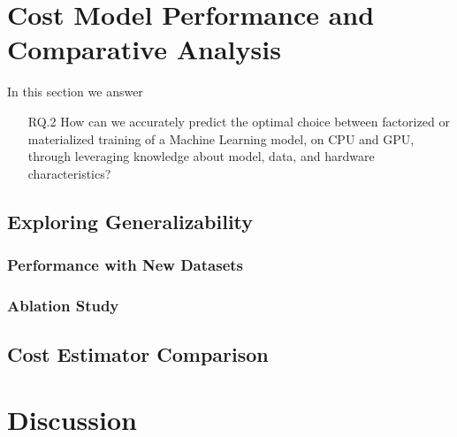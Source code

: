 \section{Cost Model Performance and Comparative Analysis}
\label{sec:eval-model-evaluation}

In this section we answer
\begin{itemize}
    \item[RQ.2] How can we accurately predict the optimal choice between factorized or materialized training of a Machine Learning model, on CPU and GPU, through leveraging knowledge about model, data, and hardware characteristics?
\end{itemize}

\subsection{Exploring Generalizability}
\subsubsection{Performance with New Datasets}

\subsubsection{Ablation Study}


\subsection{Cost Estimator Comparison}


\section{Discussion}
\label{sec:eval-discussion}

